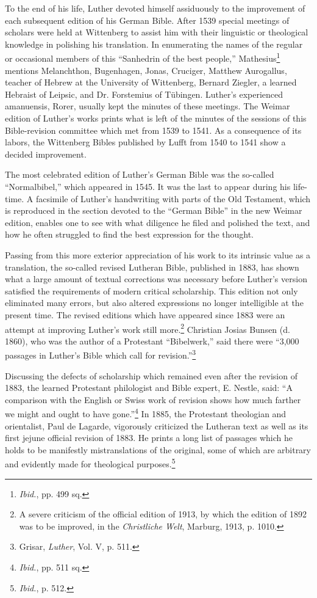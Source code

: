 To the end of his life, Luther devoted himself assiduously to the improvement
of each subsequent edition of his German Bible. After 1539 special
meetings of scholars were held at Wittenberg to assist him with their
linguistic or theological knowledge in polishing his translation. In enumerating
the names of the regular or occasional members of this “Sanhedrin of the best
people,” Mathesius\footnote{\textit{Ibid.}, pp. 499 sq.}
 mentions Melanchthon, Bugenhagen, Jonas, Cruciger,
Matthew Aurogallus, teacher of Hebrew at the University of Wittenberg,
Bernard Ziegler, a learned Hebraist of Leipsic, and Dr. Forstemius of Tübingen.
Luther’s experienced amanuensis, Rorer, usually kept the minutes of these
meetings. The Weimar edition of Luther’s works prints what is left of the
minutes of the sessions of this Bible-revision committee which met from 1539
to 1541. As a consequence of its labors, the Wittenberg Bibles published by
Lufft from 1540 to 1541 show a decided improvement.

The most celebrated edition of Luther’s German Bible was the so-called
“Normalbibel,” which appeared in 1545. It was the last to
appear during his life-time. A facsimile of Luther’s handwriting
with parts of the Old Testament, which is reproduced in the section devoted
to the “German Bible” in the new Weimar edition,
enables one to see with what diligence he filed and polished the text,
and how he often struggled to find the best expression for the thought.

Passing from this more exterior appreciation of his work to its
intrinsic value as a translation, the so-called revised Lutheran Bible,
published in 1883, has shown what a large amount of textual corrections
was necessary before Luther’s version satisfied the requirements
of modern critical scholarship. This edition not only eliminated many
errors, but also altered expressions no longer intelligible at the present
time. The revised editions which have appeared since 1883 were an
attempt at improving Luther’s work still more.\footnote
{A severe criticism of the official edition of 1913, by which the edition of 1892 was to
be improved, in the \textit{Christliche Welt}, Marburg, 1913, p. 1010.}
Christian Josias
Bunsen (d. 1860), who was the author of a Protestant “Bibelwerk,”
said there were ``3,000 passages in Luther’s Bible which call for revision.”\footnote{Grisar, \textit{Luther}, Vol. V, p. 511.}

Discussing the defects of scholarship which remained even
after the revision of 1883, the learned Protestant philologist and
Bible expert, E. Nestle, said: “A comparison with the English or
Swiss work of revision shows how much farther we might and ought
to have gone.”\footnote{\textit{Ibid.}, pp. 511 sq.}
 In 1885, the Protestant theologian and orientalist,
Paul de Lagarde, vigorously criticized the Lutheran text as well as
its first jejune official revision of 1883. He prints a long list of passages
which he holds to be manifestly mistranslations of the original,
some of which are arbitrary and evidently made for theological purposes.\footnote{\textit{Ibid.}, p. 512.}



